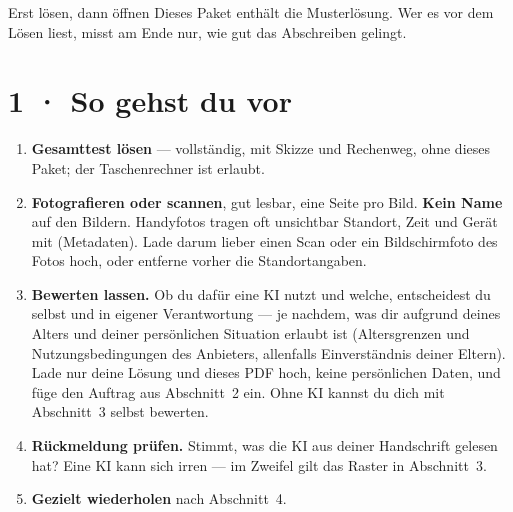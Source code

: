 \documentclass[11pt]{article}
\begin{document}

\begin{lpachtung}{Erst lösen, dann öffnen}
Dieses Paket enthält die Musterlösung. Wer es vor dem Lösen liest, misst am Ende nur, wie gut das Abschreiben gelingt.
\end{lpachtung}

\section*{1 · So gehst du vor}
\begin{enumerate}[leftmargin=*,itemsep=0pt]
\item \textbf{Gesamttest lösen} — vollständig, mit Skizze und Rechenweg, ohne dieses Paket; der Taschenrechner ist erlaubt.
\item \textbf{Fotografieren oder scannen}, gut lesbar, eine Seite pro Bild. \textbf{Kein Name} auf den Bildern.
  Handyfotos tragen oft unsichtbar Standort, Zeit und Gerät mit (Metadaten). Lade darum lieber einen Scan oder ein
  Bildschirmfoto des Fotos hoch, oder entferne vorher die Standortangaben.
\item \textbf{Bewerten lassen.} Ob du dafür eine KI nutzt und welche, entscheidest du selbst und in eigener Verantwortung —
  je nachdem, was dir aufgrund deines Alters und deiner persönlichen Situation erlaubt ist (Altersgrenzen und
  Nutzungsbedingungen des Anbieters, allenfalls Einverständnis deiner Eltern). Lade nur deine Lösung und dieses PDF hoch,
  keine persönlichen Daten, und füge den Auftrag aus Abschnitt~2 ein. Ohne KI kannst du dich mit Abschnitt~3 selbst bewerten.
\item \textbf{Rückmeldung prüfen.} Stimmt, was die KI aus deiner Handschrift gelesen hat? Eine KI kann sich irren —
  im Zweifel gilt das Raster in Abschnitt~3.
\item \textbf{Gezielt wiederholen} nach Abschnitt~4.
\end{enumerate}

\end{document}
